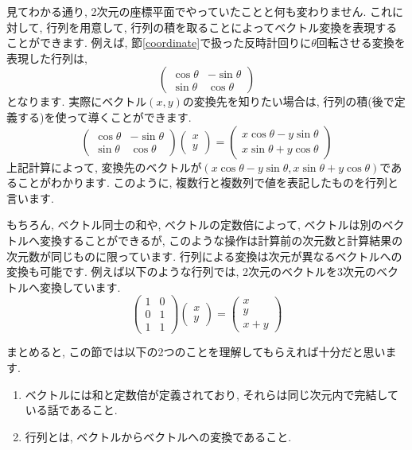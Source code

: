 \documentclass[a4paper,12pt]{jreport}
\theoremstyle{definition}
\begin{document}
   見てわかる通り,
   2次元の座標平面でやっていたことと何も変わりません.
   これに対して, 行列を用意して, 行列の積を取ることによってベクトル変換を表現することができます.
   例えば, 節\ref{coordinate}で扱った反時計回りに$\theta$回転させる変換を表現した行列は,
   $$
   \begin{pmatrix}
      \cos\theta & -\sin\theta \\
      \sin\theta & \cos\theta
   \end{pmatrix}
   $$
   となります.
   実際にベクトル$(x,y)$の変換先を知りたい場合は,
   行列の積(後で定義する)を使って導くことができます.
   $$
   \begin{pmatrix}
      \cos\theta &-\sin\theta \\
      \sin\theta & \cos\theta
   \end{pmatrix}
   \begin{pmatrix}
      x \\
      y
   \end{pmatrix}
   =
   \begin{pmatrix}
      x\cos\theta-y\sin\theta \\
      x\sin\theta+y\cos\theta
   \end{pmatrix}
   $$
   上記計算によって, 変換先のベクトルが$(x\cos\theta-y\sin\theta,x\sin\theta+y\cos\theta)$であることがわかります.
   このように, 複数行と複数列で値を表記したものを行列と言います.
   
   もちろん,
   ベクトル同士の和や, ベクトルの定数倍によって,
   ベクトルは別のベクトルへ変換することができるが,
   このような操作は計算前の次元数と計算結果の次元数が同じものに限っています.
   行列による変換は次元が異なるベクトルへの変換も可能です.
   例えば以下のような行列では,
   2次元のベクトルを3次元のベクトルへ変換しています.
   $$
   \begin{pmatrix}
      1 & 0\\
      0 & 1\\
      1 & 1
   \end{pmatrix}
   \begin{pmatrix}
      x\\
      y
   \end{pmatrix}
   =
   \begin{pmatrix}
      x\\
      y\\
      x+y
   \end{pmatrix}
   $$

   まとめると, この節では以下の2つのことを理解してもらえれば十分だと思います.
   \begin{enumerate}
      \item ベクトルには和と定数倍が定義されており, それらは同じ次元内で完結している話であること.
      \item 行列とは, ベクトルからベクトルへの変換であること.
   \end{enumerate}
\end{document}
